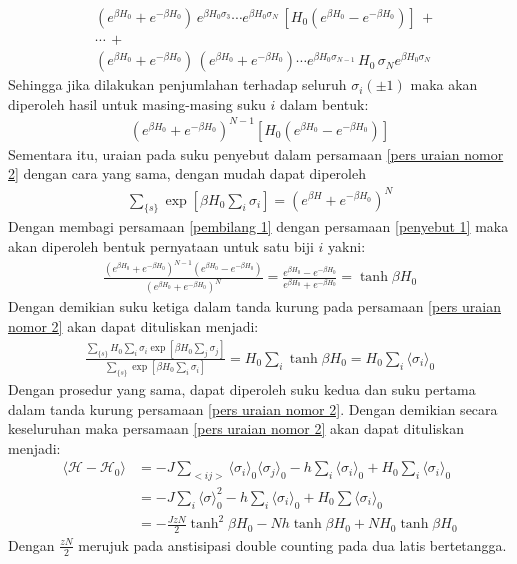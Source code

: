 \documentclass[a4paper , 12pt, cc]{article}
\begin{document}
\begin{enumerate}
\begin{enumerate}
\begin{align}
 & ( e^{\beta H_0 }  + e^{ - \beta H_0 })  \, e^{\beta H_0 \sigma_3} \cdots e^{\beta H_0 \sigma_N } \,[ H_0  (   e^{\beta H_0 } - e^{-\beta H_0} ) ] \, + \nonumber \\
 & \cdots \, + \nonumber \\ 
 & ( e^{\beta H_0 }  + e^{ - \beta H_0 })  \, ( e^{\beta H_0 }  + e^{ - \beta H_0 })  \cdots e^{\beta H_0 \sigma_{N - 1} } \, H_0 \, \sigma_N e^{\beta H_0 \sigma_N} 
\end{align}
Sehingga jika dilakukan penjumlahan terhadap seluruh $\sigma_i (\pm 1)$ maka akan diperoleh hasil  untuk masing-masing suku $i$ dalam bentuk:
\begin{align}
( e^{\beta H_0 }  + e^{ - \beta H_0 })^{N - 1}  [ H_0  (   e^{\beta H_0 } - e^{-\beta H_0} ) ]  \label{pembilang 1}
\end{align}
Sementara itu, uraian pada suku penyebut dalam persamaan  \ref{pers uraian nomor 2} dengan cara yang sama, dengan mudah dapat diperoleh
\begin{align}
\sum_{\{s\}} \exp \left[\beta H_0 \sum_i \sigma_i  \right] = (e^{\beta H} + e^{- \beta H_0})^N \label{penyebut 1}
\end{align}
Dengan membagi persamaan \ref{pembilang 1} dengan persamaan \ref{penyebut 1} maka akan diperoleh bentuk pernyataan untuk  satu biji $i$ yakni:
\begin{align}
\frac{( e^{\beta H_0} + e^{- \beta H_0})^{N - 1}  (e^{\beta H_0} -  e^{- \beta H_0})}{ (e^{\beta H_0} + e^{- \beta H_0})^N} = \frac{ e^{\beta H_0} - e^{- \beta H_0}}{e^{\beta H_0} +  e^{- \beta H_0}} = \tanh \beta H_0 
\end{align}
Dengan demikian  suku ketiga dalam tanda kurung pada persamaan \ref{pers uraian nomor 2} akan dapat dituliskan menjadi:
\begin{align}
\frac{ \sum_{\{s  \}}H_0 \sum_i \sigma_i \exp  [ \beta H_0 \sum_j \sigma_j]}{\sum_{\{s\}} \exp \left[\beta H_0 \sum_i \sigma_i  \right]} = H_0 \sum_i \tanh \beta H_0  = H_0 \sum_i \langle \sigma_i \rangle_0 
\end{align}
Dengan prosedur yang sama, dapat diperoleh suku kedua dan suku pertama dalam tanda kurung persamaan \ref{pers uraian nomor 2}. Dengan demikian secara keseluruhan maka persamaan  \ref{pers uraian nomor 2} akan dapat dituliskan menjadi:
\begin{align}
\langle \mathcal{H} - \mathcal{H}_0 \rangle  & = - J \sum_{<ij>} \langle \sigma_i \rangle_0 \langle \sigma_j \rangle_0  - h \sum_i \langle \sigma_i \rangle_0 + H_0 \sum_i \langle \sigma_i \rangle_0  \nonumber  \\
& = -J \sum_i \langle \sigma \rangle_0^2 - h \sum_i \langle \sigma_i \rangle_0 + H_0 \sum \langle \sigma_i \rangle_0  \nonumber \\
& = - \frac{J z N}{2} \tanh^2 \beta H_0 - N h \tanh \beta H_0 + N H_0 \tanh \beta H_0 
\end{align}
Dengan $\displaystyle \frac{zN }{2}$ merujuk pada anstisipasi double counting pada dua latis bertetangga. 


\end{enumerate}
\end{enumerate}
\end{document}
